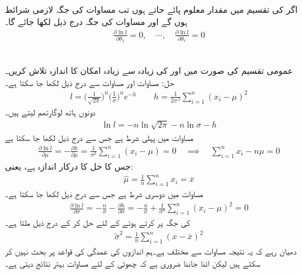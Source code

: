 اگر  کی تقسیم میں  مقدار معلوم  پائے جاتے ہوں تب مساوات  کی جگہ  لازمی شرائط  ہوں  گے اور مساوات  کی جگہ درج ذیل لکھا جائے گا۔ 
\begin{align}\label{مساوات_شماریات_زیادہ_سے_زیادہ_پ}
\frac{\partial \ln l}{\partial \theta_1}=0,\quad \cdots,\quad \frac{\partial \ln l}{\partial \theta_r}=0
\end{align}

\quad {}\\
عمومی تقسیم کی صورت میں  اور  کی زیادہ سے زیادہ امکان کا اندازہ تلاش کریں۔\\
حل:\quad
مساوات  اور  مساوات  سے درج ذیل لکھا جا سکتا ہے۔
\begin{align*}
l=\big(\frac{1}{\sqrt{2\pi}}\big)^n \big(\frac{1}{\sigma}\big)^n e^{-h}\quad \quad h=\frac{1}{2\sigma^{\,2}}\sum_{i=1}^{n}(x_i-\mu)^2
\end{align*}
دونوں ہاتھ لوگارتھم لیتے ہیں۔
\begin{align*}
\ln l=-n\ln \sqrt{2\pi}-n\ln \sigma-h
\end{align*} 
مساوات  میں پہلی شرط  ہے جس سے  درج ذیل لکھا جا سکتا ہے
\begin{align*}
\frac{\partial \ln l}{\partial \mu}=-\frac{\partial h}{\partial \mu}=\frac{1}{\sigma^2}\sum_{i=1}^{n}(x_i-\mu)=0\quad \implies \quad \sum_{i=1}^{n} x_i-n\mu=0
\end{align*}
جس کا حل  کا درکار اندازہ  ہے، یعنی:
\begin{align*}
\widehat{\mu}=\frac{1}{n}\sum_{i=1}^{n} x_i=\overline{x}
\end{align*} 
مساوات  میں دوسری شرط  ہے  جس سے  درج ذیل لکھا جا سکتا ہے۔
\begin{align*}
\frac{\partial \ln l}{\partial \sigma}=-\frac{n}{\sigma}-\frac{\partial h}{\partial \sigma}=-\frac{n}{\sigma}+\frac{1}{\sigma^3}\sum_{i=1}^{n} (x_i-\mu)^2=0
\end{align*}
 کی جگہ  پر کرتے ہوئے  کے لئے حل کر کے درج ذیل ملتا ہے۔
\begin{align*}
\widetilde{\sigma}^{2}=\frac{1}{n}\sum_{i=1}^{n} (x-\overline{x})^2
\end{align*}
دھیان رہے کہ یہ نتیجہ مساوات  سے مختلف ہے۔ہم اندازوں کی عمدگی کی قواعد پر بحث نہیں کر سکتے ہیں لیکن اتنا جاننا ضروری ہے کہ چھوٹی  کے لئے  مساوات  بہتر نتائج دیتی ہے۔

